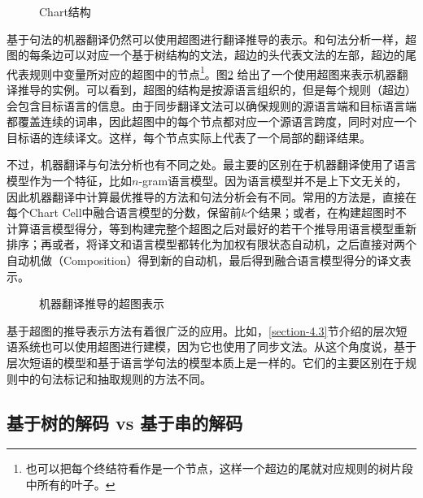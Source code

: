 \begin{figure}[htp]
\centering

\caption{Chart结构}
\label{fig:4-65}
\end{figure}

\parinterval 基于句法的机器翻译仍然可以使用超图进行翻译推导的表示。和句法分析一样，超图的每条边可以对应一个基于树结构的文法，超边的头代表文法的左部，超边的尾代表规则中变量所对应的超图中的节点\footnote[10]{ 也可以把每个终结符看作是一个节点，这样一个超边的尾就对应规则的树片段中所有的叶子。}。图\ref{fig:4-66} 给出了一个使用超图来表示机器翻译推导的实例。可以看到，超图的结构是按源语言组织的，但是每个规则（超边）会包含目标语言的信息。由于同步翻译文法可以确保规则的源语言端和目标语言端都覆盖连续的词串，因此超图中的每个节点都对应一个源语言跨度，同时对应一个目标语的连续译文。这样，每个节点实际上代表了一个局部的翻译结果。

\parinterval 不过，机器翻译与句法分析也有不同之处。最主要的区别在于机器翻译使用了语言模型作为一个特征，比如$n$-gram语言模型。因为语言模型并不是上下文无关的，因此机器翻译中计算最优推导的方法和句法分析会有不同。常用的方法是，直接在每个Chart Cell中融合语言模型的分数，保留前$k$个结果；或者，在构建超图时不计算语言模型得分，等到构建完整个超图之后对最好的若干个推导用语言模型重新排序；再或者，将译文和语言模型都转化为加权有限状态自动机，之后直接对两个自动机做{\small{}}（Composition）得到新的自动机，最后得到融合语言模型得分的译文表示。

\begin{figure}[htp]
\centering

\caption{机器翻译推导的超图表示}
\label{fig:4-66}
\end{figure}

\parinterval 基于超图的推导表示方法有着很广泛的应用。比如，\ref{section-4.3}节介绍的层次短语系统也可以使用超图进行建模，因为它也使用了同步文法。从这个角度说，基于层次短语的模型和基于语言学句法的模型本质上是一样的。它们的主要区别在于规则中的句法标记和抽取规则的方法不同。


\subsection{基于树的解码 vs 基于串的解码}

